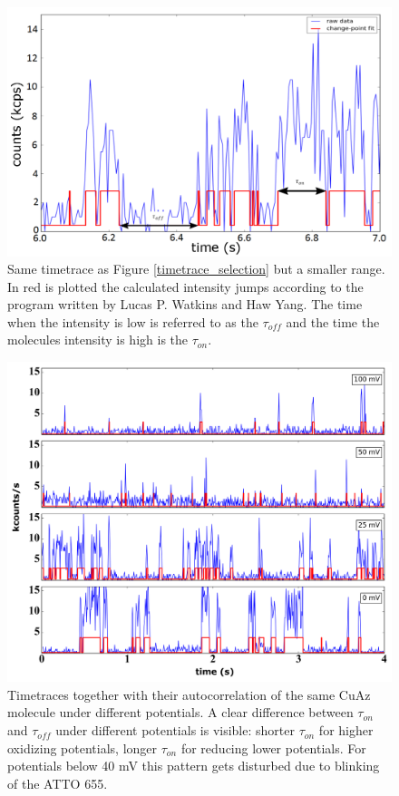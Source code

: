 \documentclass[twoside,single]{lion-msc}
\begin{document}
\begin{figure}[ht!]
\centering
\includegraphics[width=\textwidth]{on_off_test1}
\caption{Same timetrace as Figure \ref{timetrace_selection} but a smaller range. In red is plotted the calculated intensity jumps according to the program written by Lucas P. Watkins and Haw Yang. The time when the intensity is low is referred to as the $\tau_{off}$ and the time the molecules intensity is high is the $\tau_{on}$.}
\label{on_off_times}
\end{figure}

\begin{figure}[ht!]
\centering
\includegraphics[width=1\textwidth]{plots_timetraces_diff_pot}
\caption{Timetraces together with their autocorrelation of the same CuAz molecule under different potentials. A clear difference between $\tau_{on}$ and $\tau_{off}$ under different potentials is visible: shorter $\tau_{on}$ for higher oxidizing potentials, longer $\tau_{on}$ for reducing lower potentials. For potentials below 40 mV this pattern gets disturbed due to blinking of the ATTO 655.}
\label{plots_timetraces_diff_pot}
\end{figure}
\end{document}
